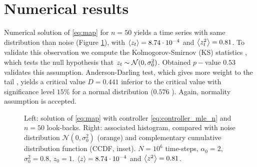 \documentclass[FinalReport.tex]{subfiles}
\begin{document}
\section{Numerical results}
Numerical solution of \eqref{eq:map} for $n=50$ yields a time series with same distribution than noise (Figure \ref{fig:dist_n_large}), with $\expval{z_t}=8.74\cdot10^{-4}$ and $\expval{z_t^2}=0.81$. To validate this observation we compute the Kolmogorov-Smirnov (KS) statistics \cite{stat_meth}, which tests the null hypothesis that $z_t\sim\mathcal{N}(0,\sigma_0^2)$. Obtained $p-$value $0.53$ validates this assumption. Anderson-Darling test, which gives more weight to the tail \cite{test_comp},  yields a critical value $D=0.441$ inferior to the critical value with significance level $15\%$ for a normal distribution ($0.576$ \cite{anderson-test}). Again, normality assumption is accepted.
\begin{figure}[h]
	\centering
	\caption{Left: solution of \eqref{eq:map} with controller \eqref{eq:controller_mle_n} and $n=50$ look-backs. Right: associated histogram, compared with noise distribution $\mathcal{N}(0,\sigma_0^2)$ (orange) and complementary cumulative distribution function (CCDF, inset). $N=10^6$ time-steps, $\alpha_0=2$, $\sigma_0^2=0.8$, $z_0=1$. $\expval{z}=8.74\cdot10^{-4}$ and $\expval{z^2}=0.81$.}
	\label{fig:dist_n_large}
\end{figure}

\def\z{0.916}
\def\varz{5.89}
\def\varzexp{5}
\def\maxz{3.29}
\def\maxzexp{5}
\end{document}
